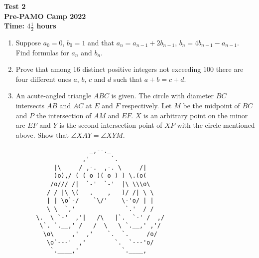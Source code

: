 \documentclass{article}
\begin{document}
	\thispagestyle{empty}
	
	\begin{center}
		\textbf{\Large Test 2}
		\\ \vspace{1em}
		\textbf{\large Pre-PAMO Camp 2022}
		\\ \vspace{1em}
		\textbf{\large Time: $4\frac{1}{2}$ hours}
	\end{center}
	
	\vspace{24pt}
	
	\begin{enumerate}[itemsep=12pt]
		
		\item 
		Suppose $a_0 = 0$, $b_0 = 1$ and that $a_n = a_{n-1} + 2b_{n-1}$, $b_n =    4b_{n-1} -a_{n-1}$. Find formulas for $a_n$ and $b_n$.
	
		\item %
		Prove that among $16$ distinct positive integers not exceeding $100$ there are four different ones $a$, $b$, $c$ and $d$ such that $a+b = c+d$.
		
		\item %
		An acute-angled triangle $ABC$ is given. The circle with diameter $BC$ intersects $AB$ and $AC$ at $E$ and $F$ respectively. Let $M$ be the midpoint of $BC$ and $P$ the intersection of $AM$ and $EF$. $X$ is an arbitrary point on the minor arc $EF$ and $Y$ is the second intersection point of $XP$ with the circle mentioned above. Show that $\angle XAY = \angle XYM$.
		
	\end{enumerate}
	
	\vfill
\centering
\begin{BVerbatim}
                        _,--._
                      ,'      `.
              |\     / ,-.  ,-. \     /|
              )o),/ ( ( o )( o ) ) \.(o(
             /o/// /|  `-'  `-'  |\ \\\o\
            / / |\ \(   .    ,   )/ /| \ \
            | | \o`-/    `\/'    \-'o/ | |
            \ \  `,'              `.'  / /
         \.  \ `-'  ,'|   /\   |`.  `-' /  ,/
          \`. `.__,' /   /  \   \ `.__,' ,'/
           \o\     ,'  ,'    `.  `.     /o/
            \o`---'  ,'        `.  `---'o/
             `.____,'            `.____,

\end{BVerbatim}
	
\end{document}
